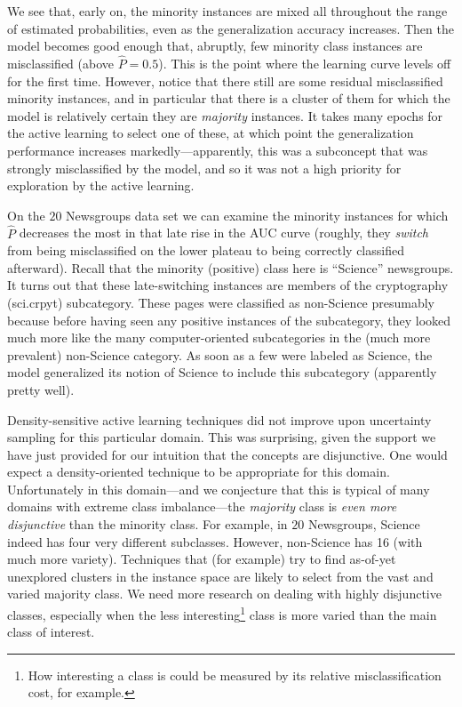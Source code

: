 We see that, early on, the minority instances are mixed all throughout the range of estimated probabilities, even as the generalization accuracy increases.  Then the model becomes good enough that, abruptly, few minority class instances are misclassified (above $\hat{P}=0.5$).  This is the point where the learning curve levels off for the first time.  However, notice that there still are some residual misclassified minority instances, and in particular that there is a cluster of them for which the model is relatively certain they are \emph{majority} instances.  It takes many epochs for the active learning to select one of these, at which point the generalization performance increases markedly---apparently, this was a subconcept that was strongly misclassified by the model, and so it was not a high priority for exploration by the active learning.

On the $20$ Newsgroups data set we can examine the minority instances for which $\hat{P}$ decreases the most in that late rise in the AUC curve (roughly, they \emph{switch} from being misclassified on the lower plateau to being correctly classified afterward).  Recall that the minority (positive) class here is ``Science'' newsgroups.  It turns out that these late-switching instances are members of the cryptography (sci.crpyt) subcategory.  These pages were classified as non-Science presumably because before having seen any positive instances of the subcategory, they looked much more like the many computer-oriented subcategories in the (much more prevalent) non-Science category.  As soon as a few were labeled as Science, the model generalized its notion of Science to include this subcategory (apparently pretty well).

Density-sensitive active learning techniques did not improve upon uncertainty sampling for this particular domain.  This was surprising, given the support we have just provided for our intuition that the concepts are disjunctive. One would expect a density-oriented technique to be appropriate for this domain.  Unfortunately in this domain---and we conjecture that this is typical of many domains with extreme class imbalance---the \emph{majority} class is \emph{even more disjunctive} than the minority class.  For example, in $20$ Newsgroups, Science indeed has four very different subclasses.  However, non-Science has 16 (with much more variety).  Techniques that (for example) try to find as-of-yet unexplored clusters in the instance space are likely to select from the vast and varied majority class.  We need more research on dealing with highly disjunctive classes, especially when the less interesting\footnote{How interesting a class is could be measured by its relative misclassification cost, for example.} class is more varied than the main class of interest.
